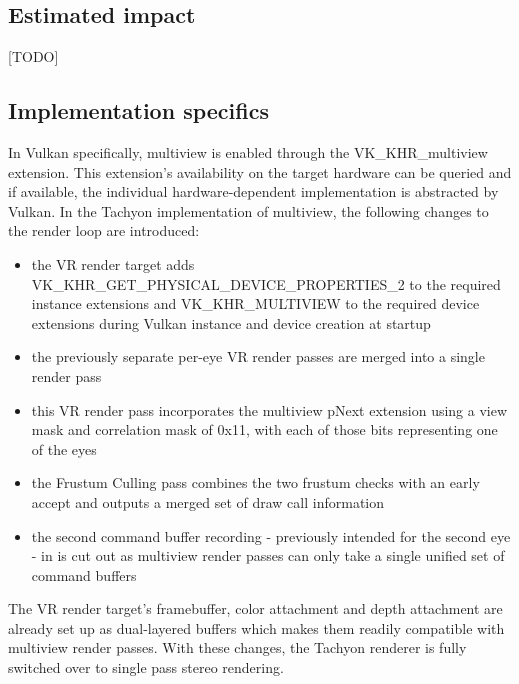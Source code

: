 \subsection{Estimated impact}
[TODO]

\subsection{Implementation specifics}
In Vulkan specifically, multiview is enabled through the VK\_KHR\_multiview extension. This extension's availability on the target hardware can be queried and if available, the individual hardware-dependent implementation is abstracted by Vulkan. 
In the Tachyon implementation of multiview, the following changes to the render loop are introduced: 
\begin{itemize}
\item the VR render target adds VK\_KHR\_GET\_PHYSICAL\_DEVICE\_PROPERTIES\_2 to the required instance extensions and VK\_KHR\_MULTIVIEW to the required device extensions during Vulkan instance and device creation at startup
\item the previously separate per-eye VR render passes are merged into a single render pass
\item this VR render pass incorporates the multiview pNext extension using a view mask and correlation mask of 0x11, with each of those bits representing one of the eyes
\item the Frustum Culling pass combines the two frustum checks with an early accept and outputs a merged set of draw call information
\item the second command buffer recording - previously intended for the second eye - in  is cut out as multiview render passes can only take a single unified set of command buffers
\end{itemize}
The VR render target's framebuffer, color attachment and depth attachment are already set up as dual-layered buffers which makes them readily compatible with multiview render passes. With these changes, the Tachyon renderer is fully switched over to single pass stereo rendering. 